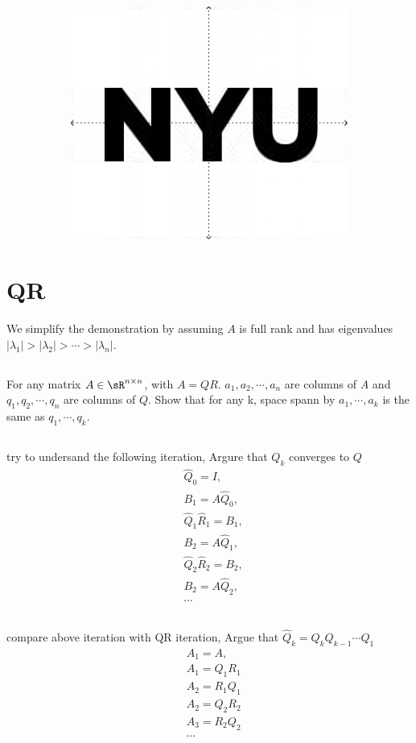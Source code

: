 \documentclass{article}%
\begin{document}
\begin{figure}[H]
\begin{subfigure}{0.3\textwidth}
        \includegraphics[width=\linewidth]{./code/compressed_rank_30.png}
        \end{subfigure}
\end{figure}


\section{QR}
We simplify the demonstration by assuming $A$ is full rank and has eigenvalues $|\lambda_1|>|\lambda_2|>\cdots>|\lambda_n|$.
\subsection{}
For any matrix $A\in \sR^{n\times n}$, with $A=QR$. $a_1,a_2,\cdots,a_n$ are columns of $A$ and $q_1,q_2,\cdots,q_n$ are columns of $Q$. Show that for any k, space spann by $a_1,\cdots,a_k$ is the same as $q_1,\cdots,q_k$.

\subsection{}
try to undersand the following iteration, Argure that $Q_k$ converges to $Q$ 
$$
\begin{aligned}
    &\hat{Q}_0=I, \\ 
    &B_1=A\hat{Q}_0,\\ 
    &\hat{Q}_1\hat{R}_1=B_1,\\ 
    &B_2=A\hat{Q}_1,\\
    &\hat{Q}_2\hat{R}_2=B_2,\\
    &B_2=A\hat{Q}_2,\\
    &\cdots
\end{aligned}
$$


\subsection{}
compare above iteration with QR iteration, Argue that $\hat{Q}_k=Q_kQ_{k-1}\cdots Q_1$ 
$$
\begin{aligned}
    &A_1=A, \\ 
    &A_1=Q_1R_1\\ 
    &A_2=R_1Q_1\\
    &A_2=Q_2R_2\\
    &A_3=R_2Q_2\\
    &\cdots
\end{aligned}
$$
\end{document}
